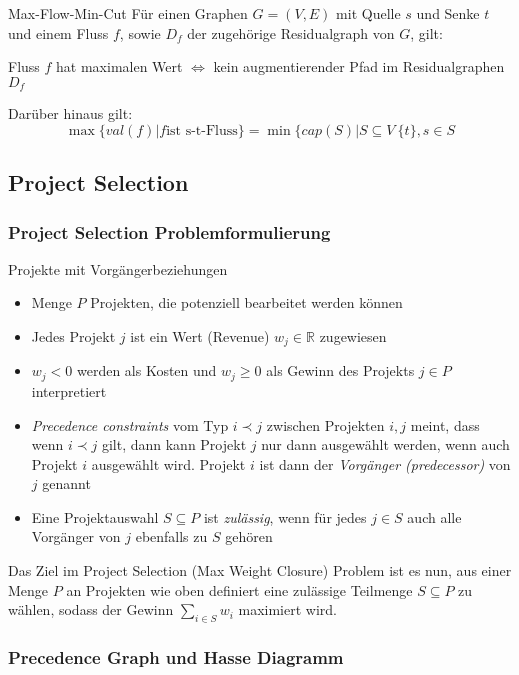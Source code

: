 \documentclass{panikzettel}
\newcommand\tab[1][1cm]{\hspace*{#1}}
\begin{document}
\begin{theo}{Max-Flow-Min-Cut}
	Für einen Graphen $G = (V,E)$ mit Quelle $s$ und Senke $t$ und einem Fluss $f$, sowie $D_f$ der zugehörige Residualgraph von $G$, gilt:
	
	\tab Fluss $f$ hat maximalen Wert $\Leftrightarrow$ kein augmentierender Pfad im Residualgraphen $D_f$
	
	Darüber hinaus gilt:	\[\max \{val(f) | f \text{ist s-t-Fluss} \} = \min \{cap(S) | S \subseteq V \ \{t \}, s\in S \]
		
\end{theo}

\subsection{Project Selection}

\subsubsection{Project Selection Problemformulierung}

\begin{defi}{Projekte mit Vorgängerbeziehungen}
	\begin{itemize}
		\item Menge $P$ Projekten, die potenziell bearbeitet werden können
		\item Jedes Projekt $j$ ist ein Wert (Revenue) $w_j \in \mathbb{R} $ zugewiesen
		\item $w_j < 0$ werden als Kosten und $ w_j \geq 0 $ als Gewinn des Projekts $j \in P$ interpretiert
		\item \emph{Precedence constraints} vom Typ $ i \prec j$ zwischen Projekten $i,j$ meint, dass wenn $i \prec j$ gilt, dann kann Projekt $j$ nur dann ausgewählt werden, wenn auch Projekt $i$ ausgewählt wird. Projekt $i$ ist dann der \emph{Vorgänger (predecessor)} von $j$ genannt
		\item Eine Projektauswahl $S \subseteq P$ ist \emph{zulässig}, wenn für jedes $j \in S$ auch alle Vorgänger von $j$ ebenfalls zu $S$ gehören
	\end{itemize}
\end{defi}

Das Ziel im Project Selection (Max Weight Closure) Problem ist es nun, aus einer Menge $P$ an Projekten wie oben definiert eine zulässige Teilmenge $S \subseteq P$ zu wählen, sodass der Gewinn $\sum_{i \in S} w_i$ maximiert wird.

\subsubsection{Precedence Graph und Hasse Diagramm}
\end{document}
